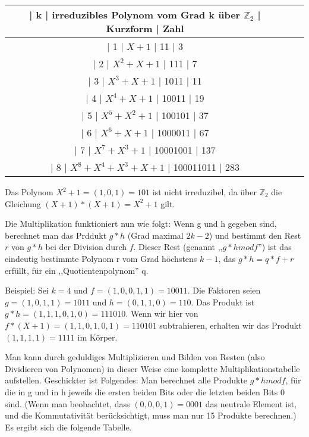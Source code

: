 \documentclass[a4paper]{article}
\begin{document}
\begin{multicols}{3}
    \begin{tabular}{c|c|c}
    | k  | irreduzibles Polynom vom Grad k über $\mathbb{Z}_2$ | Kurzform | Zahl \\\hline
    | 1  | $X+ 1$                       | 11    | 3  \\
    | 2  | $X^2 +X+ 1$                     | 111    | 7  \\
    | 3  | $X^3 +X+ 1$                     | 1011   | 11  \\
    | 4  | $X^4 +X+ 1$                     | 10011   | 19  \\
    | 5  | $X^5 +X^2 + 1$                   | 100101  | 37  \\
    | 6  | $X^6 +X+ 1$                     | 1000011  | 67 \\
    | 7  | $X^7 +X^3 + 1$                   | 10001001 | 137 \\
    | 8  | $X^8 +X^4 +X^3 +X+ 1$                | 100011011 | 283 
    \end{tabular}

    Das Polynom $X^2+1=(1,0,1)=101$ ist nicht irreduzibel, da über $\mathbb{Z}_2$ die Gleichung $(X+1)*(X+1)=X^2+1$ gilt.

    Die Multiplikation funktioniert nun wie folgt: Wenn g und h gegeben sind, berechnet man das Prddukt $g*h$ (Grad maximal $2k-2$) und bestimmt den Rest $r$ von $g*h$ bei der Division durch $f$. Dieser Rest (genannt ,,$g*h mod f$'') ist das eindeutig bestimmte Polynom r vom Grad höchstens $k-1$, das $g*h=q*f+r$ erfüllt, für ein ,,Quotientenpolynom'' q.

    Beispiel: Sei $k=4$ und $f=(1,0,0,1,1)=10011$. Die Faktoren seien $g=(1,0,1,1)=1011$ und $h=(0,1,1,0)=110$. Das Produkt ist $g*h=(1,1,1,0,1,0)=111010$. Wenn wir hier von $f*(X+1)=(1,1,0,1,0,1)=110101$ subtrahieren, erhalten wir das Produkt $(1,1,1,1)=1111$ im Körper.

    Man kann durch geduldiges Multiplizieren und Bilden von Resten (also Dividieren von Polynomen) in dieser Weise eine komplette Multiplikationstabelle aufstellen. Geschickter ist Folgendes: Man berechnet alle Produkte $g*h mod f$, für die in g und in h jeweils die ersten beiden Bits oder die letzten beiden Bits 0 sind. (Wenn man beobachtet, dass $(0,0,0,1)=0001$ das neutrale Element ist, und die Kommutativität berücksichtigt, muss man nur 15 Produkte berechnen.) Es ergibt sich die folgende Tabelle.


\end{multicols}
\end{document}
